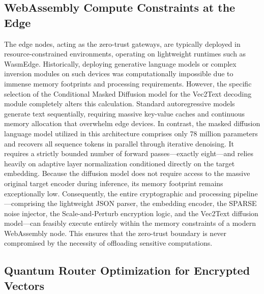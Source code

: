 \documentclass[12pt]{article}
\begin{document}
\subsection{WebAssembly Compute Constraints at the Edge}

The edge nodes, acting as the zero-trust gateways, are typically deployed in resource-constrained environments, operating on lightweight runtimes such as WasmEdge. Historically, deploying generative language models or complex inversion modules on such devices was computationally impossible due to immense memory footprints and processing requirements. However, the specific selection of the Conditional Masked Diffusion model for the Vec2Text decoding module completely alters this calculation. Standard autoregressive models generate text sequentially, requiring massive key-value caches and continuous memory allocation that overwhelm edge devices. In contrast, the masked diffusion language model utilized in this architecture comprises only 78 million parameters and recovers all sequence tokens in parallel through iterative denoising. It requires a strictly bounded number of forward passes—exactly eight—and relies heavily on adaptive layer normalization conditioned directly on the target embedding. Because the diffusion model does not require access to the massive original target encoder during inference, its memory footprint remains exceptionally low. Consequently, the entire cryptographic and processing pipeline—comprising the lightweight JSON parser, the embedding encoder, the SPARSE noise injector, the Scale-and-Perturb encryption logic, and the Vec2Text diffusion model—can feasibly execute entirely within the memory constraints of a modern WebAssembly node. This ensures that the zero-trust boundary is never compromised by the necessity of offloading sensitive computations.

\subsection{Quantum Router Optimization for Encrypted Vectors}
\end{document}
